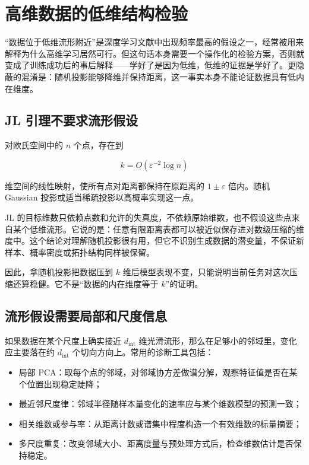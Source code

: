 \section{高维数据的低维结构检验}
\label{sec:14-Deep-Learning/07-Interpretability-Mathematics/03}

``数据位于低维流形附近''是深度学习文献中出现频率最高的假设之一，经常被用来解释为什么高维学习居然可行。但这句话本身需要一个操作化的检验方案，否则就变成了训练成功后的事后解释——学好了是因为低维，低维的证据是学好了。更隐蔽的混淆是：随机投影能够降维并保持距离，这一事实本身不能论证数据具有低内在维度。

\subsection{JL 引理不要求流形假设}

\begin{theorem}
对欧氏空间中的 \(n\) 个点，存在到

\[
k=O\!\left(\varepsilon^{-2}\log n\right)
\]

维空间的线性映射，使所有点对距离都保持在原距离的 \(1\pm\varepsilon\) 倍内。随机 Gaussian 投影或适当稀疏投影以高概率实现这一点。
\end{theorem}

JL 的目标维数只依赖点数和允许的失真度，不依赖原始维数，也不假设这些点来自某个低维流形。它说的是：任意有限距离表都可以被近似保存进对数级压缩的维度中。这个结论对理解随机投影很有用，但它不识别生成数据的潜变量，不保证新样本、概率密度或拓扑结构同样被保留。

因此，拿随机投影把数据压到 \(k\) 维后模型表现不变，只能说明当前任务对这次压缩还算稳健。它不是``数据的内在维度等于 \(k\)''的证明。

\subsection{流形假设需要局部和尺度信息}

如果数据在某个尺度上确实接近 \(d_{\mathrm{int}}\) 维光滑流形，那么在足够小的邻域里，变化应主要落在约 \(d_{\mathrm{int}}\) 个切向方向上。常用的诊断工具包括：

\begin{itemize}
\tightlist
\item 局部 PCA：取每个点的邻域，对邻域协方差做谱分解，观察特征值是否在某个位置出现稳定陡降；
\item 最近邻尺度律：邻域半径随样本量变化的速率应与某个维数模型的预测一致；
\item 相关维数或参与率：从距离计数或谱集中程度构造一个有效维数的标量摘要；
\item 多尺度重复：改变邻域大小、距离度量与预处理方式后，检查维数估计是否保持稳定。
\end{itemize}

